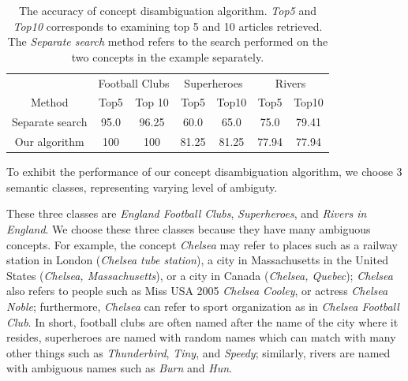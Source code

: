 \begin{table}[t]
\begin{center}
\begin{tabular}{|c||c|c|c|c|c|c|}
\hline
             & \multicolumn{2}{c|}{Football Clubs} & \multicolumn{2}{c|}{Superheroes} & \multicolumn{2}{c|}{Rivers} \\
\cline{2-7}  Method & Top5 & Top 10 & Top5 & Top10 & Top5 & Top10 \\
\hline
\hline
 Separate search & 95.0 & 96.25 & 60.0    & 65.0   & 75.0   & 79.41 \\
 Our algorithm  & 100  & 100    & 81.25 & 81.25 & 77.94 & 77.94  \\
\hline
\end{tabular}
\caption{The accuracy of concept disambiguation algorithm. {\em Top5}
  and {\em Top10} corresponds to examining top 5 and 10 articles
  retrieved. The {\em Separate search} method
  refers to the search performed on the two concepts in the example
  separately.}
\label{tab:exp-con-disamb}
\end{center}
\end{table}

To exhibit the performance of our concept disambiguation algorithm, we
choose 3 semantic classes, representing varying level of ambiguty.

These three classes are {\em England Football Clubs}, {\em
  Superheroes}, and {\em Rivers in England}. We choose these three
classes because they have many ambiguous concepts. For example, the
concept {\em Chelsea} may refer to places such as a railway station in
London ({\em Chelsea tube station}), a city in Massachusetts in the
United States ({\em Chelsea, Massachusetts}), or a city in Canada
({\em Chelsea, Quebec}); {\em Chelsea} also refers to people such as
Miss USA 2005 {\em Chelsea Cooley}, or actress {\em Chelsea Noble};
furthermore, {\em Chelsea} can refer to sport organization as in {\em
  Chelsea Football Club}. In short, football clubs are often named
after the name of the city where it resides, superheroes are named
with random names which can match with many other things such as {\em
  Thunderbird}, {\em Tiny}, and {\em Speedy}; similarly, rivers are
named with ambiguous names such as {\em Burn} and {\em Hun}.

